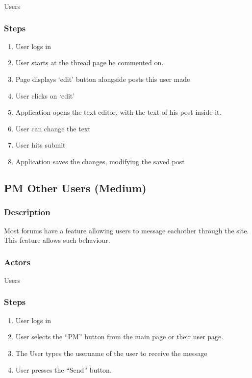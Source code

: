 \documentclass[12pt]{scrartcl}
\begin{document}
Users

\subsubsection{Steps}

\begin{enumerate}
\item User logs in
\item User starts at the thread page he commented on.
\item Page displays ‘edit’ button alongside posts this user made
\item User clicks on ‘edit’
\item Application opens the text editor, with the text of his post inside it.
\item User can change the text
\item User hits submit
\item  Application saves the changes, modifying the saved post
\end{enumerate}

\subsection{PM Other Users (Medium)}
\subsubsection{Description}

Most forums have a feature allowing users to message eachother through the site. This
feature allows such behaviour.

\subsubsection{Actors}

Users

\subsubsection{Steps}
\begin{enumerate}
\item User logs in
\item User selects the ``PM'' button from the main page or their user page.
\item The User types the username of the user to receive the message
\item User presses the ``Send'' button.
\end{enumerate}
\end{document}
